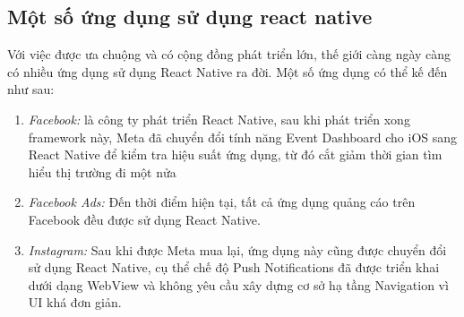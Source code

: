 \subsection{Một số ứng dụng sử dụng react native}
Với việc được ưa chuộng và có cộng đồng phát triển lớn, thế giới càng ngày càng có nhiều ứng dụng sử dụng React Native ra đời. Một số ứng dụng có thể kế đến như sau:
\begin{enumerate}
    \item {\textit{Facebook:}} là công ty phát triển React Native, sau khi phát triển xong framework này, Meta đã chuyển đổi tính năng Event Dashboard cho iOS sang React Native để kiểm tra hiệu suất ứng dụng, từ đó cắt giảm thời gian tìm hiểu thị trường đi một nửa
    \item {\textit{Facebook Ads:}} Đến thời điểm hiện tại, tất cả ứng dụng quảng cáo trên Facebook đều được sử dụng React Native.
    \item {\textit{Instagram:}} Sau khi được Meta mua lại, ứng dụng này cũng được chuyển đổi sử dụng React Native, cụ thể chế độ Push Notifications đã được triển khai dưới dạng WebView và không yêu cầu xây dựng cơ sở hạ tầng Navigation vì UI khá đơn giản.
\end{enumerate}
